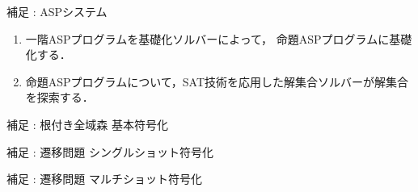 \begin{frame}{補足 : ASPシステム}
 
 \vspace{-0.5cm}

 \begin{figure}[htbp]
  \centering
  
 \end{figure}

 \vspace{-0.5cm}

 \begin{exampleblock}{}
  \begin{enumerate}
   \item 一階ASPプログラムを基礎化ソルバーによって，
		 命題ASPプログラムに\alert{基礎化}する．
   \item 命題ASPプログラムについて，SAT技術を応用した解集合ソルバーが解集合を探索する．
  \end{enumerate}
 \end{exampleblock}

\end{frame}


\begin{frame}[fragile]{補足 : 根付き全域森 基本符号化}
 \begin{exampleblock}{}
  \begin{center}
   
  \end{center}
 \end{exampleblock}
\end{frame}

\begin{frame}[fragile]{補足 : 遷移問題 シングルショット符号化}
\begin{multicols*}{2}

 
\end{multicols*}
\end{frame}

\begin{frame}[fragile]{補足 : 遷移問題 マルチショット符号化}



\end{frame}

\backupend
